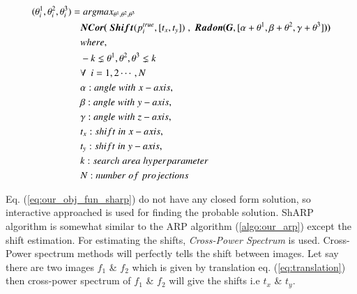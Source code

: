 \documentclass[twoside]{iitbreport}
\begin{document}
\begin{equation}\label{eq:our_obj_fun_sharp}
  \begin{aligned}
    (\theta^1_i,\theta^2_i,\theta^3_i)  = & \hspace{0.1cm} argmax_{\theta^1,\theta^2,\theta^3} \hspace{0.1cm} \\ &\boldsymbol{NCor(}\hspace{0.1cm}\boldsymbol{Shift} ( p_i^{true} , [t_x,t_y])\hspace{0.1cm} , \hspace{0.1cm} \boldsymbol{Radon(G}, [ \alpha+\theta^1,\beta+\theta^2,\gamma+\theta^3 ] \boldsymbol{)} \boldsymbol{)}\\
    & where,\\
    &  -k \lneq \theta^1,\theta^2,\theta^3 \lneq k\\
    &  \forall \enspace i = 1,2 \cdots , N\\
    & \alpha : angle\hspace{0.1cm}with\hspace{0.1cm}x-axis,\\
    & \beta : angle\hspace{0.1cm}with\hspace{0.1cm}y-axis,\\
    & \gamma : angle\hspace{0.1cm}with\hspace{0.1cm}z-axis,\\
    & t_x : shift\hspace{0.1cm}in\hspace{0.1cm}x-axis,\\
    & t_y : shift\hspace{0.1cm}in\hspace{0.1cm}y-axis,\\
    &  k : search\hspace{0.1cm}area\hspace{0.1cm}hyperparameter \\
    & N: number\hspace{0.1cm}of\hspace{0.1cm}projections\\
  \end{aligned}
\end{equation}


Eq. (\ref{eq:our_obj_fun_sharp}) do not have any closed form solution, so interactive approached is used for finding the probable solution. ShARP algorithm is somewhat similar to the ARP algorithm (\ref{algo:our_arp}) except the shift estimation. For estimating the shifts, \textit{Cross-Power Spectrum} \cite{reddy1996fft} is used. Cross-Power spectrum methods will perfectly tells the shift between images. Let say there are two  images ${f_1}$ \& ${f_2}$ which is given by translation eq. (\ref{eq:translation}) then cross-power spectrum of ${f_1}$ \& ${f_2}$ will give the shifts i.e ${t_x}$ \& ${t_y}$. 
\end{document}
